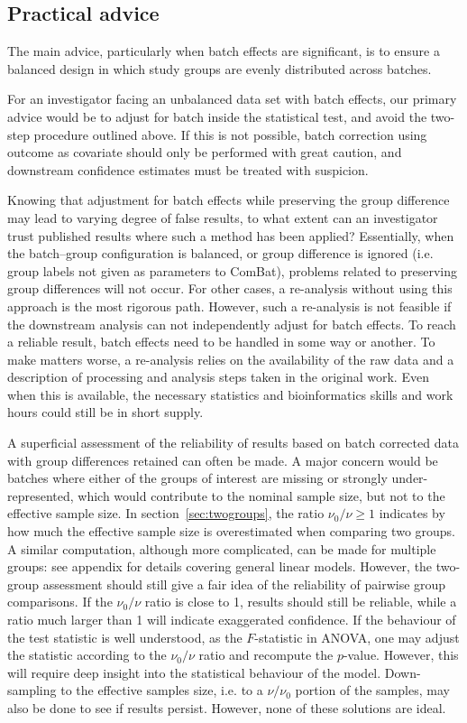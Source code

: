 \documentclass{bio}
\begin{document}
\subsection{Practical advice}

The main advice, particularly when batch effects are significant, is to ensure a balanced design in which study groups are evenly distributed across batches.

For an investigator facing an unbalanced data set with batch effects, our primary advice would be to adjust for batch inside the statistical test, and avoid the two-step procedure outlined above. If this is not possible, batch correction using outcome as covariate should only be performed with great caution, and downstream confidence estimates must be treated with suspicion.

Knowing that adjustment for batch effects while preserving the group difference may lead to varying degree of false results, to what extent can an investigator trust published results where such a method has been applied? Essentially, when the batch--group configuration is balanced, or group difference is ignored  (i.e. group labels not given as parameters to ComBat), problems related to preserving group differences will not occur. For other cases, a re-analysis without using this approach is the most rigorous path. However, such a re-analysis is not feasible if the downstream  analysis can not independently adjust for batch effects. To reach a reliable result, batch effects need to be handled in some way or another. To make matters worse, a re-analysis relies on the availability of the raw data and a description of processing and analysis steps taken in the original work. Even when this is available, the necessary statistics and bioinformatics skills and work hours could still be in short supply.

A superficial assessment of the reliability of results based on batch corrected data with group differences retained can often be made. A major concern would be batches where either of the groups of interest are missing or strongly under-represented, which would contribute to the nominal sample size, but not to the effective sample size. In section~\ref{sec:twogroups}, the ratio $\nu_0/\nu\ge1$ indicates by how much the effective sample size is overestimated when comparing two groups. A similar computation, although more complicated, can be made for multiple groups: see appendix for details covering general linear models. However, the two-group assessment should still give a fair idea of the reliability of pairwise group comparisons. If the $\nu_0/\nu$ ratio is close to 1, results should still be reliable, while a ratio much larger than 1 will indicate exaggerated confidence. If the behaviour of the test statistic is well understood, as the $F$-statistic in ANOVA, one may adjust the statistic according to the $\nu_0/\nu$ ratio and recompute the $p$-value. However, this will require deep insight into the statistical behaviour of the model. Down-sampling to the effective samples size, i.e. to a $\nu/\nu_0$ portion of the samples, may also be done to see if results persist. However, none of these solutions are ideal.
\end{document}
